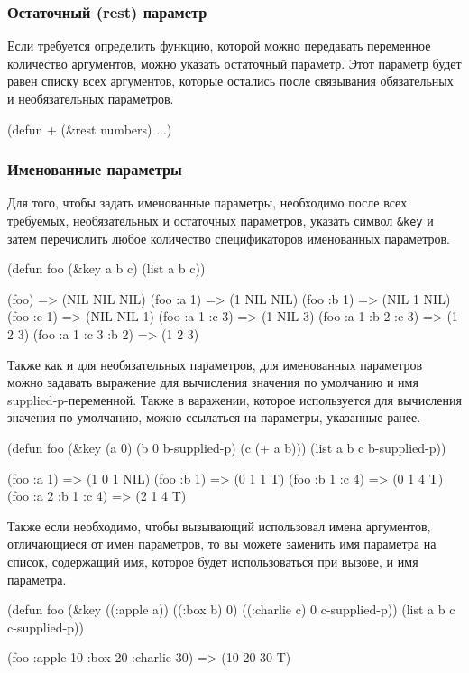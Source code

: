 \subsubsection{Остаточный (rest) параметр}
Если требуется определить функцию, которой можно передавать переменное количество аргументов, можно указать остаточный параметр. Этот параметр будет равен списку всех аргументов, которые остались после связывания обязательных и необязательных параметров.
\begin{cllst}{}{}
(defun + (&rest numbers) ...)
\end{cllst}

\subsubsection{Именованные параметры}
Для того, чтобы задать именованные параметры, необходимо после всех требуемых, необязательных и остаточных параметров, указать символ \lstinline{&key} и затем перечислить любое количество спецификаторов именованных параметров.
\begin{cllst}{}{}
(defun foo (&key a b c) 
  (list a b c))

(foo)                => (NIL NIL NIL)
(foo :a 1)           => (1 NIL NIL)
(foo :b 1)           => (NIL 1 NIL)
(foo :c 1)           => (NIL NIL 1)
(foo :a 1 :c 3)      => (1 NIL 3)
(foo :a 1 :b 2 :c 3) => (1 2 3)
(foo :a 1 :c 3 :b 2) => (1 2 3)
\end{cllst}

Также как и для необязательных параметров, для именованных параметров можно задавать выражение для вычисления значения по умолчанию и имя supplied-p-переменной. Также в варажении, которое используется для вычисления значения по умолчанию, можно ссылаться на параметры, указанные ранее.
\begin{cllst}{}{}
(defun foo (&key (a 0) (b 0 b-supplied-p) (c (+ a b)))
  (list a b c b-supplied-p))

(foo :a 1)           => (1 0 1 NIL)
(foo :b 1)           => (0 1 1 T)
(foo :b 1 :c 4)      => (0 1 4 T)
(foo :a 2 :b 1 :c 4) => (2 1 4 T)
\end{cllst}

Также если необходимо, чтобы вызывающий использовал имена аргументов, отличающиеся от имен параметров, то вы можете заменить имя параметра на список, содержащий имя, которое будет использоваться при вызове, и имя параметра.
\begin{cllst}{}{}
(defun foo (&key ((:apple a)) ((:box b) 0) ((:charlie c) 0 c-supplied-p))
  (list a b c c-supplied-p))

(foo :apple 10 :box 20 :charlie 30) => (10 20 30 T)
\end{cllst}

